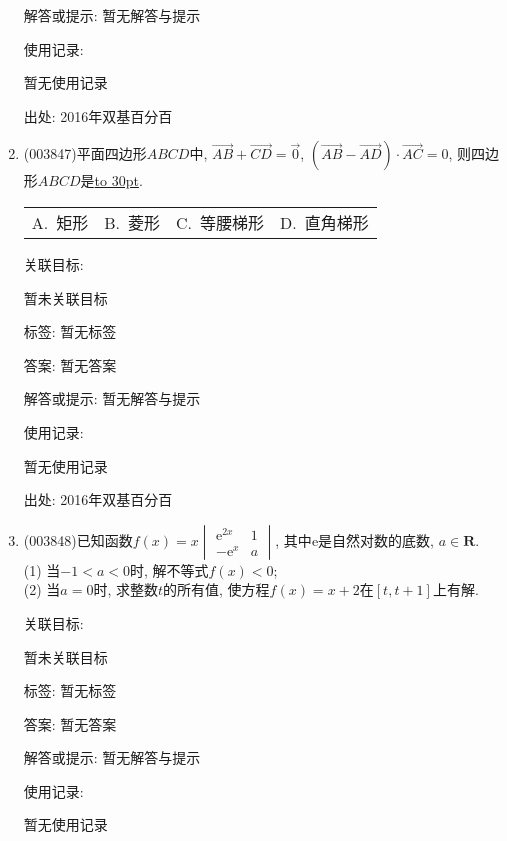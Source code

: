 \documentclass[10pt,a4paper]{article}
\newcommand{\blank}[1]{\underline{\hbox to #1pt{}}}
\newcommand{\fourch}[4]{\par\begin{tabular}{p{.23\textwidth}p{.23\textwidth}p{.23\textwidth}p{.23\textwidth}}
A.~#1 &B.~#2& C.~#3& D.~#4
\end{tabular}}
\begin{document}
\begin{enumerate}[1.]
解答或提示: 暂无解答与提示

使用记录:

暂无使用记录


出处: 2016年双基百分百
\item { (003847)}平面四边形$ABCD$中, $\overrightarrow{AB}+\overrightarrow{CD}=\overrightarrow{0}$, $(\overrightarrow{AB}-\overrightarrow{AD})\cdot \overrightarrow{AC}=0$, 则四边形$ABCD$是\blank{30}.
\fourch{矩形}{菱形}{等腰梯形}{直角梯形}


关联目标:

暂未关联目标



标签: 暂无标签

答案: 暂无答案

解答或提示: 暂无解答与提示

使用记录:

暂无使用记录


出处: 2016年双基百分百
\item { (003848)}已知函数$f(x)=x\begin{vmatrix}
\mathrm{e}^{2x} & 1\\-\mathrm{e}^x & a
\end{vmatrix}$, 其中$\mathrm{e}$是自然对数的底数, $a\in \mathbf{R}$.\\
(1) 当$-1<a<0$时, 解不等式$f(x)<0$;\\
(2) 当$a=0$时, 求整数$t$的所有值, 使方程$f(x)=x+2$在$[t,t+1]$上有解.


关联目标:

暂未关联目标



标签: 暂无标签

答案: 暂无答案

解答或提示: 暂无解答与提示

使用记录:

暂无使用记录



\end{enumerate}
\end{document}
